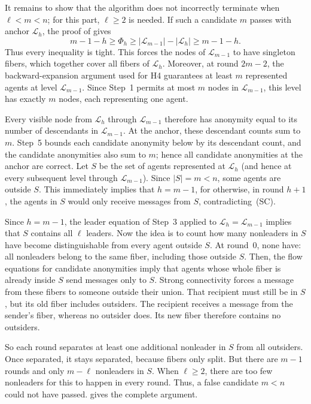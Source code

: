 \documentclass[11pt]{article}
\begin{document}
It remains to show that the algorithm does not incorrectly terminate when \(\ell<m<n\); for this part, $\ell\geq 2$ is needed. If such a candidate \(m\)
passes with anchor \(\mathcal L_h\), the proof of
 gives
\[
 m-1-h\geq\Phi_h
 \geq|\mathcal L_{m-1}|-|\mathcal L_h|
 \geq m-1-h.
\]
Thus every inequality is tight. This forces the nodes of
\(\mathcal L_{m-1}\) to have singleton fibers, which together
cover all fibers of $\mathcal L_h$. Moreover, at round \(2m-2\), the backward-expansion
argument used for H4 guarantees at least \(m\) represented agents
at level \(\mathcal L_{m-1}\). Since Step~1 permits at most \(m\) nodes in \(\mathcal L_{m-1}\), this level has exactly \(m\) nodes, each representing one agent.

Every visible node from \(\mathcal L_h\) through
\(\mathcal L_{m-1}\) therefore has anonymity equal to its number
of descendants in \(\mathcal L_{m-1}\).
At the anchor, these descendant counts sum to \(m\).
Step~5 bounds each candidate anonymity below by its descendant
count, and the candidate anonymities also sum to \(m\);
hence all candidate anonymities at the anchor are correct.
Let \(S\) be the set of agents represented at \(\mathcal L_h\) (and hence at every subsequent level through \(\mathcal L_{m-1}\)).
Since \(|S|=m<n\), some agents are outside \(S\). This immediately implies that $h=m-1$, for otherwise, in round $h+1$, the agents in $S$ would only receive messages from $S$, contradicting~\textup{(SC)}.

Since $h=m-1$, the leader equation of Step~3 applied to $\mathcal L_h=\mathcal L_{m-1}$ implies that \(S\) contains all \(\ell\) leaders. Now the idea is to count how many nonleaders in \(S\) have become distinguishable from every agent outside \(S\). At round~0, none have: all nonleaders belong to the same fiber, including those outside \(S\). Then, the flow equations for candidate anonymities imply that agents whose whole fiber is already inside \(S\) send messages only to \(S\). Strong connectivity forces a message from these fibers to someone outside their union. That recipient must still be in \(S\), but its old fiber includes outsiders. The recipient receives a message from the sender's fiber, whereas no outsider does. Its new fiber therefore contains no outsiders.

So each round separates at least one additional nonleader in \(S\) from all outsiders. Once separated, it stays separated, because fibers only split.
But there are \(m-1\) rounds and only \(m-\ell\) nonleaders in \(S\). When \(\ell\geq2\), there are too few nonleaders for this to happen in every round. Thus, a false candidate $m<n$ could not have passed.  gives the complete argument.
\end{document}
